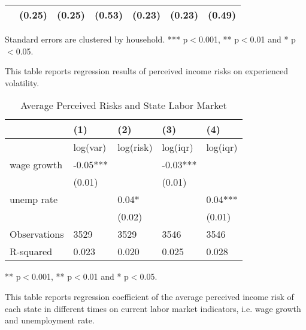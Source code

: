 \begin{table}[p]
\begin{adjustbox}{width=\textwidth}
\begin{threeparttable}
\begin{tabular}{lllllll}
                 &    (0.25) &    (0.25) &     (0.53) &    (0.23) &     (0.23) &      (0.49) \\
\bottomrule
\end{tabular}
\begin{tablenotes}\item Standard errors are clustered by household. *** p$<$0.001, ** p$<$0.01 and * p$<$0.05. 
\item This table reports regression results of perceived income risks on experienced volatility.
\end{tablenotes}
\end{threeparttable}
\end{adjustbox}
\end{table}
	
	\begin{table}[ht]
		\centering
		\begin{adjustbox}{width=0.5\textwidth}
			\begin{threeparttable}
			\caption{Average Perceived Risks and State Labor Market}
			\label{macro_corr_he_state}
			\begin{tabular}{lllll}
				\hline 
				& (1)                & (2)                & (3)               & (4)               \\
				\hline 
				& log(var) & log(risk) & log(iqr) & log(iqr) \\
				\hline 
				wage growth & -0.05***           &                    & -0.03***          &                   \\
				
				& (0.01)             &                    & (0.01)            &                   \\
				unemp rate &                    & 0.04*              &                   & 0.04***           \\
				&                    & (0.02)             &                   & (0.01)            \\
				\hline 
				Observations      & 3529               & 3529               & 3546              & 3546              \\
				R-squared         & 0.023              & 0.020              & 0.025             & 0.028            \\
				\hline 
			\end{tabular}
			
				\begin{tablenotes}
					\item *** p$<$0.001, ** p$<$0.01 and * p$<$0.05.
					\item This table reports regression coefficient of the average perceived income risk of each state in different times on current labor market indicators, i.e. wage growth and unemployment rate. 
				\end{tablenotes}
			\end{threeparttable}
		\end{adjustbox}
	\end{table}
